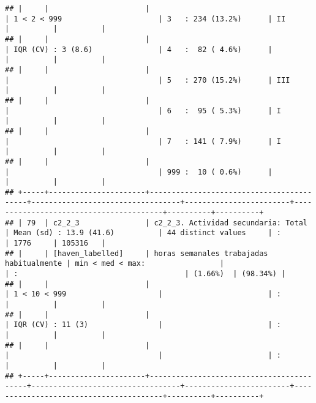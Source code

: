 \documentclass[]{article}
\begin{document}
\begin{verbatim}
## |     |                      |                                          | 1 < 2 < 999                      | 3   : 234 (13.2%)      | II                                     |          |          |
## |     |                      |                                          | IQR (CV) : 3 (8.6)               | 4   :  82 ( 4.6%)      |                                        |          |          |
## |     |                      |                                          |                                  | 5   : 270 (15.2%)      | III                                    |          |          |
## |     |                      |                                          |                                  | 6   :  95 ( 5.3%)      | I                                      |          |          |
## |     |                      |                                          |                                  | 7   : 141 ( 7.9%)      | I                                      |          |          |
## |     |                      |                                          |                                  | 999 :  10 ( 0.6%)      |                                        |          |          |
## +-----+----------------------+------------------------------------------+----------------------------------+------------------------+----------------------------------------+----------+----------+
## | 79  | c2_2_3               | c2_2_3. Actividad secundaria: Total      | Mean (sd) : 13.9 (41.6)          | 44 distinct values     | :                                      | 1776     | 105316   |
## |     | [haven_labelled]     | horas semanales trabajadas habitualmente | min < med < max:                 |                        | :                                      | (1.66%)  | (98.34%) |
## |     |                      |                                          | 1 < 10 < 999                     |                        | :                                      |          |          |
## |     |                      |                                          | IQR (CV) : 11 (3)                |                        | :                                      |          |          |
## |     |                      |                                          |                                  |                        | :                                      |          |          |
## +-----+----------------------+------------------------------------------+----------------------------------+------------------------+----------------------------------------+----------+----------+

\end{verbatim}
\end{document}
